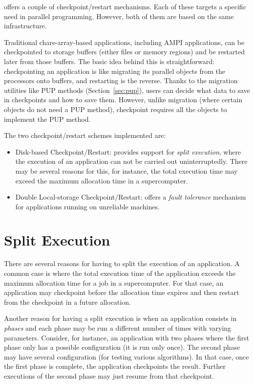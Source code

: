 \charmpp{} offers a couple of checkpoint/restart mechanisms. Each of these targets a specific need in parallel programming. However, both of them are based on the same infrastructure. 

Traditional chare-array-based \charmpp{} applications, including AMPI applications, can be checkpointed to storage buffers (either files or memory regions) and be restarted later from those buffers. The basic idea behind this is straightforward: checkpointing an application is like migrating its parallel objects from the processors onto buffers, and restarting is the reverse. Thanks to the migration utilities like PUP methods (Section~\ref{sec:pup}), users can decide what data to save in checkpoints and how to save them. However, unlike migration (where certain objects do not need a PUP method), checkpoint requires all the objects to implement the PUP method.

The two checkpoint/restart schemes implemented are:
\begin{itemize}
\item Disk-based Checkpoint/Restart: provides support for \emph{split execution}, where the execution of an application can not be carried out uninterruptedly. There may be several reasons for this, for instance, the total execution time may exceed the maximum allocation time in a supercomputer.
\item Double Local-storage Checkpoint/Restart: offers a \emph{fault tolerance} mechanism for applications running on unreliable machines.
\end{itemize}


\section{Split Execution}
There are several reasons for having to split the execution of an application. A common case is where the total execution time of the application exceeds the maximum allocation time for a job in a supercomputer. For that case, an application may checkpoint before the allocation time expires and then restart from the checkpoint in a future allocation. 

Another reason for having a split execution is when an application consists in \emph{phases} and each phase may be run a different number of times with varying parameters. Consider, for instance, an application with two phases where the first phase only has a possible configuration (it is run only once). The second phase may have several configuration (for testing various algorithms). In that case, once the first phase is complete, the application checkpoints the result. Further executions of the second phase may just resume from that checkpoint.

